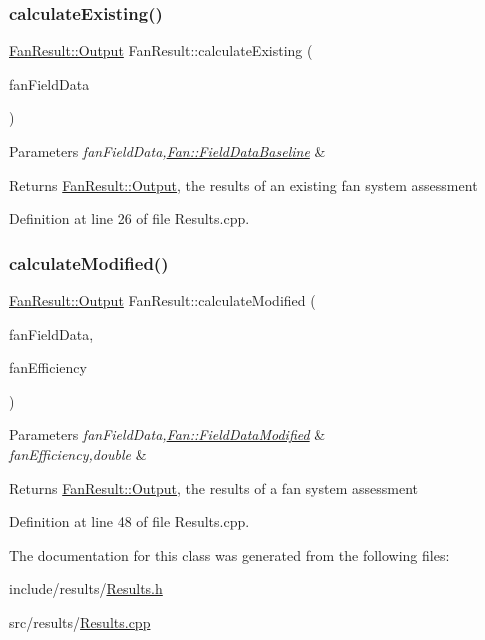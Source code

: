 \subsubsection{\texorpdfstring{calculate\+Existing()}{calculateExisting()}}
{\footnotesize\ttfamily \hyperlink{struct_fan_result_1_1_output}{Fan\+Result\+::\+Output} Fan\+Result\+::calculate\+Existing (\begin{DoxyParamCaption}\item[{\hyperlink{struct_fan_1_1_field_data_baseline}{Fan\+::\+Field\+Data\+Baseline} const \&}]{fan\+Field\+Data }\end{DoxyParamCaption})}


\begin{DoxyParams}{Parameters}
{\em fan\+Field\+Data,\hyperlink{struct_fan_1_1_field_data_baseline}{Fan\+::\+Field\+Data\+Baseline}} & \\
\hline
\end{DoxyParams}
\begin{DoxyReturn}{Returns}
\hyperlink{struct_fan_result_1_1_output}{Fan\+Result\+::\+Output}, the results of an existing fan system assessment 
\end{DoxyReturn}


Definition at line 26 of file Results.\+cpp.

\mbox{\label{class_fan_result_ac8b8ab301fca8ce4d37e6d4fbd44b9b9}} 
\subsubsection{\texorpdfstring{calculate\+Modified()}{calculateModified()}}
{\footnotesize\ttfamily \hyperlink{struct_fan_result_1_1_output}{Fan\+Result\+::\+Output} Fan\+Result\+::calculate\+Modified (\begin{DoxyParamCaption}\item[{\hyperlink{struct_fan_1_1_field_data_modified}{Fan\+::\+Field\+Data\+Modified} const \&}]{fan\+Field\+Data,  }\item[{double}]{fan\+Efficiency }\end{DoxyParamCaption})}


\begin{DoxyParams}{Parameters}
{\em fan\+Field\+Data,\hyperlink{struct_fan_1_1_field_data_modified}{Fan\+::\+Field\+Data\+Modified}} & \\
\hline
{\em fan\+Efficiency,double} & \\
\hline
\end{DoxyParams}
\begin{DoxyReturn}{Returns}
\hyperlink{struct_fan_result_1_1_output}{Fan\+Result\+::\+Output}, the results of a fan system assessment 
\end{DoxyReturn}


Definition at line 48 of file Results.\+cpp.



The documentation for this class was generated from the following files\+:\begin{DoxyCompactItemize}
\item 
include/results/\hyperlink{_results_8h}{Results.\+h}\item 
src/results/\hyperlink{_results_8cpp}{Results.\+cpp}\end{DoxyCompactItemize}
